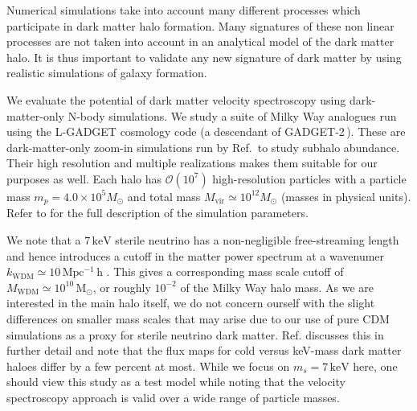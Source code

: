 \documentclass[aps,prd,10pt,twocolumn,superscriptaddress,showpacs]{revtex4-1}
\newcommand{\units}[1]{\,\mathrm{#1}}
\begin{document}
Numerical simulations take into account many different processes which participate in dark matter halo formation.  Many signatures of these non linear processes are not taken into account in an analytical model of the dark matter halo.  It is thus important to validate any new signature of dark matter by using realistic simulations of galaxy formation.

We evaluate the potential of dark matter velocity spectroscopy using dark-matter-only N-body
simulations.  We study a suite of Milky Way analogues run using the L-GADGET cosmology code (a
descendant of GADGET-2\,\cite{springel2005}). These are dark-matter-only zoom-in simulations run by
Ref.\,\cite{mao2015} to study subhalo abundance. Their high resolution and multiple realizations
makes them suitable for our purposes as well. Each halo has $\mathcal{O}(10^7)$ high-resolution
particles with a particle mass $m_p=4.0 \times 10^5 M_{\odot}$ and total  mass
$M_{\mathrm{vir}}\simeq 10^{12} M_{\odot}$ (masses in physical units). Refer to \cite{mao2015} for
the full description of the simulation parameters.

We note that a $7\units{keV}$ sterile neutrino has a non-negligible free-streaming length 
and hence introduces a cutoff in
the matter power spectrum at a wavenumer $k_\mathrm{WDM} \simeq 10 \units{Mpc^{-1}\,h}$
\cite{ven2016}. This gives a corresponding mass scale cutoff of $M_\mathrm{WDM} \simeq 10^{10}
\units{M_\odot}$, or roughly $10^{-2}$ of the Milky Way halo mass. As we are interested in the main
halo itself, we do not concern ourself with the slight differences on smaller mass scales that may
arise due to our use of pure CDM simulations as a proxy for sterile neutrino dark matter. Ref. \cite{Lovell:2014lea}
discusses this in further detail and note that the flux maps for cold versus keV-mass dark matter
haloes differ by a few percent at most. While we focus on $m_s=7\units{keV}$ here,
one should view this study as a test model while noting that the velocity spectroscopy approach is
valid over a wide range of particle masses.
\end{document}
